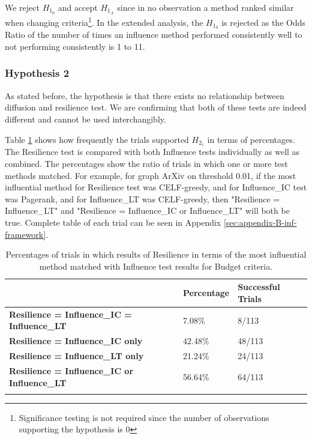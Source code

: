 			We reject $H_{1_0}$ and accept $H_{1_A}$ since in no observation a method ranked similar when changing criteria\footnote{Significance testing is not required since the number of observations supporting the hypothesis is 0}. In the extended analysis, the $H_{1_0}$ is rejected as the Odds Ratio of the number of times an influence method performed consistently well to not performing consistently is 1 to 11.
			
			\subsubsection{Hypothesis 2}
			As stated before, the hypothesis is that there exists no relationship between diffusion and resilience test. We are confirming that both of these tests are indeed different and cannot be used interchangibly.
			
			Table \ref{tab:inf-framework-test-method-comparison} shows how frequently the trials supported $H_{2_1}$ in terms of percentages. The Resilience test is compared with both Influence tests individually as well as combined. The percentages show the ratio of trials in which one or more test methods matched. For example, for graph ArXiv on threshold 0.01, if the most influential method for Resilience test was CELF-greedy, and for Influence\_IC test was Pagerank, and for Influence\_LT was CELF-greedy, then "Resilience = Influence\_LT" and "Resilience = Influence\_IC or Influence\_LT" will both be true. Complete table of each trial can be seen in Appendix \ref{sec:appendix-B-inf-framework}.			
			
			\begin{longtable}[c]{|l|l|l|}
				\hline
				\textbf{}                                            & \textbf{Percentage} & \textbf{Successful Trials} \\ \hline
				\endfirsthead
				\endhead
				\textbf{Resilience = Influence\_IC = Influence\_LT}  & 7.08\%              & 8/113                      \\ \hline
				\textbf{Resilience = Influence\_IC only}             & 42.48\%             & 48/113                     \\ \hline
				\textbf{Resilience = Influence\_LT only}             & 21.24\%             & 24/113                     \\ \hline
				\textbf{Resilience = Influence\_IC or Influence\_LT} & 56.64\%             & 64/113                     \\ \hline
				\caption[Ratio of result matches of resilience test with influence tests]{Percentages of trials in which results of Resilience in terms of the most influential method matched with Influence test results for Budget criteria.}
				\label{tab:inf-framework-test-method-comparison} \\
			\end{longtable}

